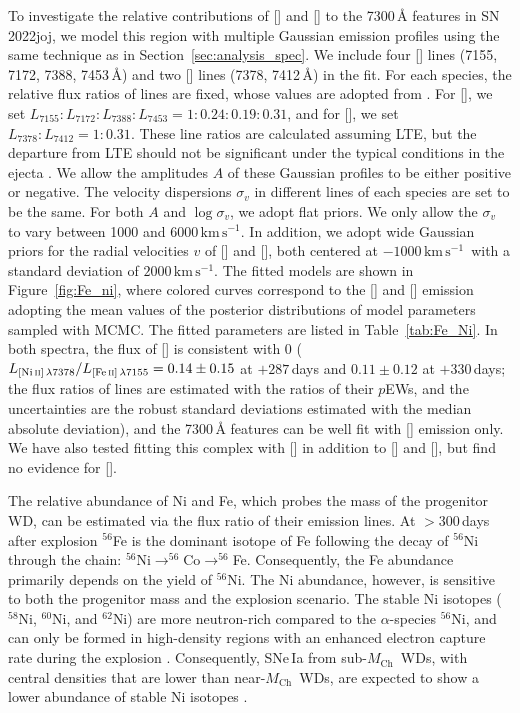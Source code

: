 \documentclass[twocolumn]{aastex631}
\newcommand{\sn}{SN\,2022joj}
\newcommand{\Mch}{$M_\mathrm{Ch}$}
\newcommand{\kms}{$\mathrm{km}\,\mathrm{s}^{-1}$}
\begin{document}
\begin{CJK*}{UTF8}{gbsn}
To investigate the relative contributions of [] and [] to the 7300\,\r{A} features in \sn, we model this region with multiple Gaussian emission profiles using the same technique as in Section~\ref{sec:analysis_spec}. We include four [] lines (7155, 7172, 7388, 7453\,\r{A}) and two [] lines (7378, 7412\,\r{A}) in the fit. For each species, the relative flux ratios of lines are fixed, whose values are adopted from \citet{Jerkstrand_2015}. For [], we set $L_{7155}:L_{7172}:L_{7388}:L_{7453} = 1:0.24:0.19:0.31$, and for [], we set $L_{7378}:L_{7412} = 1:0.31$. These line ratios are calculated assuming LTE, but the departure from LTE should not be significant under the typical conditions in the ejecta \citep{Jerkstrand_2015}. We allow the amplitudes $A$ of these Gaussian profiles to be either positive or negative. The velocity dispersions $\sigma_v$ in different lines of each species are set to be the same. For both $A$ and $\log\sigma_v$, we adopt flat priors. We only allow the $\sigma_v$ to vary between 1000 and 6000\,\kms. In addition, we adopt wide Gaussian priors for the radial velocities $v$ of [] and [], both centered at $-1000$\,\kms\ with a standard deviation of $2000$\,\kms. The fitted models are shown in Figure~\ref{fig:Fe_ni}, where colored curves correspond to the [] and [] emission adopting the mean values of the posterior distributions of model parameters sampled with MCMC. The fitted parameters are listed in Table~\ref{tab:Fe_Ni}. In both spectra, the flux of [] is consistent with 0 (${L_{[\mathrm{Ni}\,\textsc{ii}]\,\lambda7378}}/{L_{[\mathrm{Fe}\,\textsc{ii}]\,\lambda7155}}=0.14\pm0.15$ at $+287$\,days and $0.11\pm0.12$ at $+330$\,days; the flux ratios of lines are estimated with the ratios of their $p$EWs, and the uncertainties are the robust standard deviations estimated with the median absolute deviation), and the 7300\,\r{A} features can be well fit with [] emission only. We have also tested fitting this complex with [] in addition to [] and [], but find no evidence for [].

The relative abundance of Ni and Fe, which probes the mass of the progenitor WD, can be estimated via the flux ratio of their emission lines. At $>$300\,days after explosion $^{56}$Fe is the dominant isotope of Fe following the decay of $^{56}$Ni through the chain: $^{56}$Ni$\rightarrow^{56}$Co$\rightarrow^{56}$Fe. Consequently, the Fe abundance primarily depends on the yield of $^{56}$Ni. The Ni abundance, however, is sensitive to both the progenitor mass and the explosion scenario. The stable Ni isotopes ($^{58}$Ni, $^{60}$Ni, and $^{62}$Ni) are more neutron-rich compared to the $\alpha$-species $^{56}$Ni, and can only be formed in high-density regions with an enhanced electron capture rate during the explosion \citep{Nomoto_1984,Khokhlov_1991}. Consequently, SNe\,Ia from sub-\Mch\ WDs, with central densities that are lower than near-\Mch\ WDs, are expected to show a lower abundance of stable Ni isotopes \citep{Iwamoto_1999,Seitenzahl_2013,Shen_DD_2018}. 


\end{CJK*}
\end{document}
